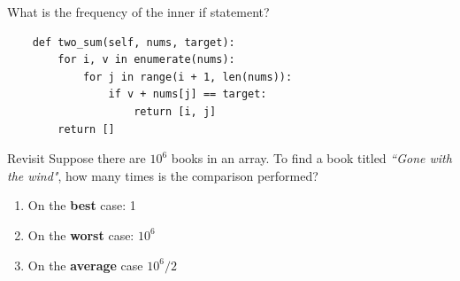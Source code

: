 \documentclass[aspectratio=169, 14pt]{beamer}
\begin{document}
\begin{frame}[fragile]

	{\large {}} What is the frequency of the inner \alert{if} statement?
	\begin{verbatim}
    def two_sum(self, nums, target):
        for i, v in enumerate(nums):
            for j in range(i + 1, len(nums)):
                if v + nums[j] == target:
                    return [i, j]
        return []
    \end{verbatim}


\end{frame}

\begin{frame}
	\begin{block}{Revisit}
		Suppose there are $10^6$ books in an array. To find a book titled \emph{``Gone with the wind"}, how many times is the comparison performed?
		\begin{enumerate}
			\item On the \textbf{best} case: 1
			\item On the \textbf{worst} case: $10^6$
			\item On the \textbf{average} case $10^6/2$
		\end{enumerate}
	\end{block}
\end{frame}
\end{document}
